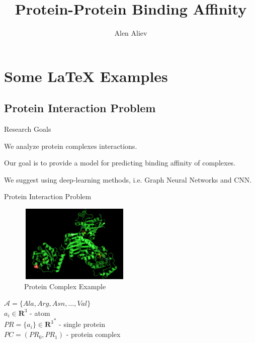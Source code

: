 \documentclass{beamer}
\title[Your Short Title]{Protein-Protein Binding Affinity}
\author{Alen Aliev}
\institute{MIPT}
\date{}
\begin{document}
\begin{frame}
  \titlepage
\end{frame}


\section{Some \LaTeX{} Examples}

\subsection{Protein Interaction Problem}

\begin{frame}{Research Goals}

We analyze protein complexes interactions. \\ 
\bigskip

Our goal is to provide a model for predicting binding affinity of complexes. \\
\bigskip

We suggest using deep-learning methods, i.e. Graph Neural Networks and CNN.

\end{frame}


\begin{frame}{Protein Interaction Problem}

\begin{figure}
\includegraphics[width=200px, height=140px]{ProteinExample.png}
\caption{\label{fig:your-figure}Protein Complex Example}
\end{figure}

$\mathcal{A} = \{Ala, Arg, Asn, \ldots, Val \}$ \\
$a_i \in \mathbf{R}^3$ - atom \\
$PR = \{a_i\} \in  {\mathbf{R}^3}^*$ - single protein \\
$PC = (PR_0, PR_1)$ - protein complex \\

\end{frame}
\end{document}
